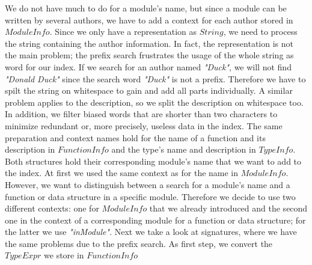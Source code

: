 \documentclass[%
	latex,%
	a4paper,%
	oneside,%
	chapterprefix,%
	headsepline,%
	12pt%
]{scrbook}
\newcommand{\textss}[1]{"#1"}
\newcommand{\Conid}[1]{\mathit{#1}}
\begin{document}
\begin{table}[h]
\caption{The contexts for a \ensuremath{\Conid{ModuleInfo}} data structure}
\label{t:modcontext}
\end{table}

We do not have much to do for a module's name, but since a module can
be written by several authors, we have to add a context for each
author stored in \ensuremath{\Conid{ModuleInfo}}. %
Since we only have a representation as \ensuremath{\Conid{String}}, we need to process
the string containing the author information. %
In fact, the representation is not the main problem; the prefix search
frustrates the usage of the whole string as word for our index. %
If we search for an author named \emph{\textss{Duck}}, we will not
find \emph{\textss{Donald Duck}} since the search word
\emph{\textss{Duck}} is not a prefix. %
Therefore we have to spilt the string on whitespace to gain and add
all parts individually. %
A similar problem applies to the description, so we split the
description on whitespace too. %
In addition, we filter biased words that are shorter than two
characters to minimize redundant or, more precisely, useless data in
the index. %
The same preparation and context names hold for the name of a function
and its description in \ensuremath{\Conid{FunctionInfo}} and the type's name and
description in \ensuremath{\Conid{TypeInfo}}. %
Both structures hold their corresponding module's name that we want to
add to the index. %
At first we used the same context as for the name in \ensuremath{\Conid{ModuleInfo}}. %
However, we want to distinguish between a search for a module's name
and a function or data structure in a specific module. %
Therefore we decide to use two different contexts: one for
\ensuremath{\Conid{ModuleInfo}} that we already introduced and the second one in the
context of a corresponding module for a function or data structure;
for the latter we use \emph{\textss{inModule}}. %
Next we take a look at signatures, where we have the same problems due
to the prefix search. %
As first step, we convert the \ensuremath{\Conid{TypeExpr}} we store in \ensuremath{\Conid{FunctionInfo}}
\end{document}
